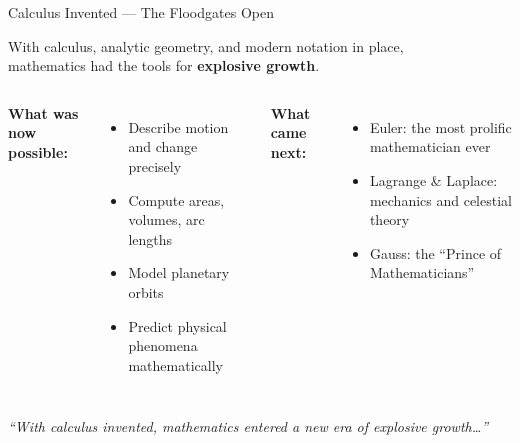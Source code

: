 \begin{frame}[shrink=12]{Calculus Invented --- The Floodgates Open}
  \centering

  {\small With calculus, analytic geometry, and modern notation in place,\\
  mathematics had the tools for \textbf{explosive growth}.}

  \vspace{0.6em}


  \vspace{0.8em}

  \begin{columns}[T]
    {\small\textbf{What was now possible:}}
    \begin{itemize}\setlength\itemsep{2pt}
      \item[\textcolor{renaissanceGold}{\faCheck}] {\footnotesize Describe motion and change precisely}
      \item[\textcolor{renaissanceGold}{\faCheck}] {\footnotesize Compute areas, volumes, arc lengths}
      \item[\textcolor{renaissanceGold}{\faCheck}] {\footnotesize Model planetary orbits}
      \item[\textcolor{renaissanceGold}{\faCheck}] {\footnotesize Predict physical phenomena mathematically}
    \end{itemize}

    {\small\textbf{What came next:}}
    \begin{itemize}\setlength\itemsep{2pt}
      \item[\textcolor{enlightenmentTeal}{\faArrowRight}] {\footnotesize Euler: the most prolific mathematician ever}
      \item[\textcolor{enlightenmentTeal}{\faArrowRight}] {\footnotesize Lagrange \& Laplace: mechanics and celestial theory}
      \item[\textcolor{enlightenmentTeal}{\faArrowRight}] {\footnotesize Gauss: the ``Prince of Mathematicians''}
    \end{itemize}
  \end{columns}

  \vspace{0.5em}
  {\small\itshape ``With calculus invented, mathematics entered a new era of explosive growth\ldots''}

\end{frame}
